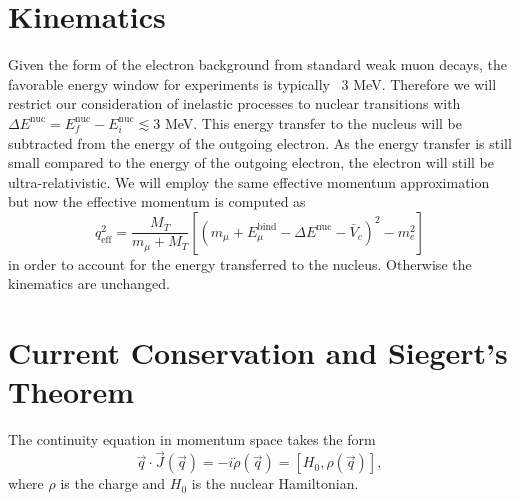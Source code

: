 \documentclass{book}[letterpaper,12pt]
\begin{document}
\section{Kinematics}
Given the form of the electron background from standard weak muon decays, the favorable energy window for experiments is typically ~3 MeV. Therefore we will restrict our consideration of inelastic processes to nuclear transitions with $\Delta E^\mathrm{nuc}=E^\mathrm{nuc}_f-E^\mathrm{nuc}_i \lesssim 3$ MeV. This energy transfer to the nucleus will be subtracted from the energy of the outgoing electron. As the energy transfer is still small compared to the energy of the outgoing electron, the electron will still be ultra-relativistic. We will employ the same effective momentum approximation but now the effective momentum is computed as
\begin{equation}
q^2_\mathrm{eff}=\frac{M_T}{m_{\mu}+M_T}\left[\left(m_{\mu}+E_{\mu}^\mathrm{bind}-\Delta E^\mathrm{nuc}-\bar{V}_c\right)^2-m_e^2\right]
\end{equation}
in order to account for the energy transferred to the nucleus. Otherwise the kinematics are unchanged.
\section{Current Conservation and Siegert's Theorem}
The continuity equation in momentum space takes the form
\begin{equation}
\vec{q}\cdot\vec{J}(\vec{q})=-i\dot{\rho}(\vec{q})=\left[H_0,\rho(\vec{q})\right],
\end{equation}
where $\rho$ is the charge and $H_0$ is the nuclear Hamiltonian.
\end{document}
